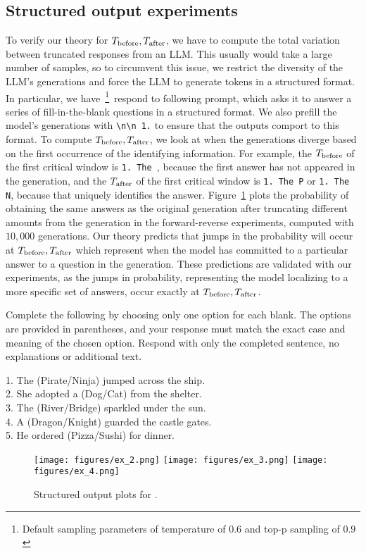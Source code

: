 \subsection{Structured output experiments}\label{sec:structured_output}
To verify our theory for $T_{\mathrm{before}},T_{\mathrm{after}}$, we have to compute the total variation between truncated responses from an LLM. This usually would take a large number of samples, so to circumvent this issue, we restrict the diversity of the LLM's generations and force the LLM to generate tokens in a structured format. In particular, we have~\llamainstruct\footnote{Default sampling parameters of temperature of $0.6$ and top-p sampling of $0.9$}~respond to following prompt, which asks it to answer a series of fill-in-the-blank questions in a structured format. We also prefill the model's generations with \texttt{\textbackslash n\textbackslash n 1.} to ensure that the outputs comport to this format. To compute $T_{\mathrm{before}},T_{\mathrm{after}}$, we look at when the generations diverge based on the first occurrence of the identifying information. For example, the $T_{\mathrm{before}}$ of the first critical window is \texttt{1. The }, because the first answer has not appeared in the generation, and the $T_{\mathrm{after}}$ of the first critical window is \texttt{1. The P} or \texttt{1. The N}, because that uniquely identifies the answer. Figure~\ref{fig:app:structured_llama} plots the probability of obtaining the same answers as the original generation after truncating different amounts from the generation in the forward-reverse experiments, computed with $10,000$ generations. Our theory predicts that jumps in the probability will occur at $T_{\mathrm{before}},T_{\mathrm{after}}$ which represent when the model has committed to a particular answer to a question in the generation. These predictions are validated with our experiments, as the jumps in probability, representing the model localizing to a more specific set of answers, occur exactly at $T_{\mathrm{before}},T_{\mathrm{after}}$.
\begin{tcolorbox}[colback=blue!5!white,colframe=blue!75!black,title=Structured Output Prompt]
Complete the following by choosing only one option for each blank. The options are provided in parentheses, and your response must match the exact case and meaning of the chosen option. Respond with only the completed sentence, no explanations or additional text.

1. The (Pirate/Ninja) jumped across the ship. \\
2. She adopted a (Dog/Cat) from the shelter. \\
3. The (River/Bridge) sparkled under the sun. \\
4. A (Dragon/Knight) guarded the castle gates. \\
5. He ordered (Pizza/Sushi) for dinner.
\end{tcolorbox}
\begin{figure}[H] 
    \centering
    \texttt{[image: figures/ex\_2.png]}
    \texttt{[image: figures/ex\_3.png]}
    \texttt{[image: figures/ex\_4.png]}
    \caption{Structured output plots for \llamainstruct.}
    \label{fig:app:structured_llama}
\end{figure}

